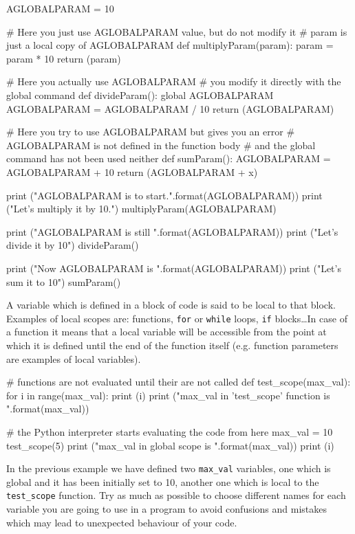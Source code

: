 \begin{ipython}
AGLOBALPARAM = 10

# Here you just use AGLOBALPARAM value, but do not modify it
# param is just a local copy of AGLOBALPARAM
def multiplyParam(param):
    param = param * 10
    return (param)

# Here you actually use AGLOBALPARAM
# you modify it directly with the global command
def divideParam():
    global AGLOBALPARAM
    AGLOBALPARAM = AGLOBALPARAM / 10
    return (AGLOBALPARAM)

# Here you try to use AGLOBALPARAM but gives you an error
# AGLOBALPARAM is not defined in the function body
# and the global command has not been used neither
def sumParam():
    AGLOBALPARAM = AGLOBALPARAM + 10
    return (AGLOBALPARAM + x)

print ("AGLOBALPARAM is {} to start.".format(AGLOBALPARAM))
print ("Let's multiply it by 10.")
multiplyParam(AGLOBALPARAM)

print ("AGLOBALPARAM is still {}".format(AGLOBALPARAM))
print ("Let's divide it by 10")
divideParam()

print ("Now AGLOBALPARAM is {}".format(AGLOBALPARAM))
print ("Let's sum it to 10")
sumParam()
\end{ipython}

A variable which is defined in a block of code is said to be local to that block. Examples of local scopes are: functions, \texttt{for} or \texttt{while} loops, \texttt{if} blocks\ldots In case of a function it means that a local variable will be accessible from the point at which it is defined until the end of the function itself (e.g. function parameters are examples of local variables).

\begin{ipython}
# functions are not evaluated until their are not called
def test_scope(max_val):
    for i in range(max_val):
        print (i)
    print ("max_val in 'test_scope' function is {}".format(max_val))

# the Python interpreter starts evaluating the code from here
max_val = 10
test_scope(5)
print ("max_val in global scope is {}".format(max_val))
print (i)
\end{ipython}

In the previous example we have defined two \texttt{max\_val} variables, one which is global and it has been initially set to 10, another one which is local to the \texttt{test\_scope} function.
Try as much as possible to choose different names for each variable you are going to use 
in a program to avoid confusions and mistakes which may lead to unexpected behaviour of your code.

